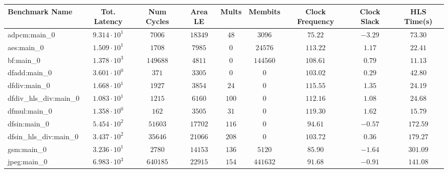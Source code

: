 \begin{tabular}{|l|c|c|c|c|c|c|c|c|}
\hline
Benchmark Name          & Tot. Latency           & Num Cycles  & Area LE    & Mults   & Membits    & Clock Frequency & Clock Slack & HLS Time(s) \\
\hline
adpcm:main\_0           & $ 9.314 \cdot 10^{1} $ & $ 7006    $ & $ 18349  $ & $ 48  $ & $ 3096   $ & $ 75.22       $ & $ -3.29   $ & $ 73.30   $ \\
aes:main\_0             & $ 1.509 \cdot 10^{1} $ & $ 1708    $ & $ 7985   $ & $ 0   $ & $ 24576  $ & $ 113.22      $ & $ 1.17    $ & $ 22.41   $ \\
bf:main\_0              & $ 1.378 \cdot 10^{3} $ & $ 149688  $ & $ 4811   $ & $ 0   $ & $ 144560 $ & $ 108.61      $ & $ 0.79    $ & $ 11.13   $ \\
dfadd:main\_0           & $ 3.601 \cdot 10^{0} $ & $ 371     $ & $ 3305   $ & $ 0   $ & $ 0      $ & $ 103.02      $ & $ 0.29    $ & $ 42.80   $ \\
dfdiv:main\_0           & $ 1.668 \cdot 10^{1} $ & $ 1927    $ & $ 3854   $ & $ 24  $ & $ 0      $ & $ 115.55      $ & $ 1.35    $ & $ 24.19   $ \\
dfdiv\_hls\_div:main\_0 & $ 1.083 \cdot 10^{1} $ & $ 1215    $ & $ 6160   $ & $ 100 $ & $ 0      $ & $ 112.16      $ & $ 1.08    $ & $ 24.68   $ \\
dfmul:main\_0           & $ 1.358 \cdot 10^{0} $ & $ 162     $ & $ 3505   $ & $ 31  $ & $ 0      $ & $ 119.30      $ & $ 1.62    $ & $ 15.79   $ \\
dfsin:main\_0           & $ 5.454 \cdot 10^{2} $ & $ 51603   $ & $ 17702  $ & $ 116 $ & $ 0      $ & $ 94.61       $ & $ -0.57   $ & $ 172.59  $ \\
dfsin\_hls\_div:main\_0 & $ 3.437 \cdot 10^{2} $ & $ 35646   $ & $ 21066  $ & $ 208 $ & $ 0      $ & $ 103.72      $ & $ 0.36    $ & $ 179.27  $ \\
gsm:main\_0             & $ 3.236 \cdot 10^{1} $ & $ 2780    $ & $ 14153  $ & $ 136 $ & $ 5120   $ & $ 85.90       $ & $ -1.64   $ & $ 301.09  $ \\
jpeg:main\_0            & $ 6.983 \cdot 10^{3} $ & $ 640185  $ & $ 22915  $ & $ 154 $ & $ 441632 $ & $ 91.68       $ & $ -0.91   $ & $ 141.08  $ \\

\end{tabular}
